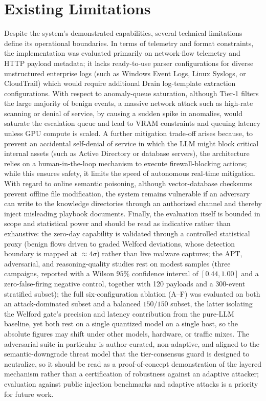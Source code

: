 \section{Existing Limitations}
Despite the system's demonstrated capabilities, several technical limitations define its operational boundaries. In terms of telemetry and format constraints, the implementation was evaluated primarily on network-flow telemetry and HTTP payload metadata; it lacks ready-to-use parser configurations for diverse unstructured enterprise logs (such as Windows Event Logs, Linux Syslogs, or CloudTrail) which would require additional Drain log-template extraction configurations. With respect to anomaly-queue saturation, although Tier-1 filters the large majority of benign events, a massive network attack such as high-rate scanning or denial of service, by causing a sudden spike in anomalies, would saturate the escalation queue and lead to VRAM constraints and queuing latency unless GPU compute is scaled. A further mitigation trade-off arises because, to prevent an accidental self-denial of service in which the LLM might block critical internal assets (such as Active Directory or database servers), the architecture relies on a human-in-the-loop mechanism to execute firewall-blocking actions; while this ensures safety, it limits the speed of autonomous real-time mitigation. With regard to online semantic poisoning, although vector-database checksums prevent offline file modification, the system remains vulnerable if an adversary can write to the knowledge directories through an authorized channel and thereby inject misleading playbook documents. Finally, the evaluation itself is bounded in scope and statistical power and should be read as indicative rather than exhaustive: the zero-day capability is validated through a controlled statistical proxy (benign flows driven to graded Welford deviations, whose detection boundary is mapped at $\approx 4\sigma$) rather than live malware captures; the APT, adversarial, and reasoning-quality studies rest on modest samples (three campaigns, reported with a Wilson $95\%$ confidence interval of $[0.44, 1.00]$ and a zero-false-firing negative control, together with 120 payloads and a 300-event stratified subset); the full six-configuration ablation (A--F) was evaluated on both an attack-dominated subset and a balanced $150/150$ subset, the latter isolating the Welford gate's precision and latency contribution from the pure-LLM baseline, yet both rest on a single quantized model on a single host, so the absolute figures may shift under other models, hardware, or traffic mixes. The adversarial suite in particular is author-curated, non-adaptive, and aligned to the semantic-downgrade threat model that the tier-consensus guard is designed to neutralize, so it should be read as a proof-of-concept demonstration of the layered mechanism rather than a certification of robustness against an adaptive attacker; evaluation against public injection benchmarks and adaptive attacks is a priority for future work.

